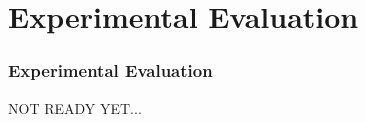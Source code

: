 \section{Experimental Evaluation}

\begin{frame}
	\frametitle{Experimental Evaluation}
	
	\Large
	
	\begin{center}
		NOT READY YET...
	\end{center}
\end{frame}
